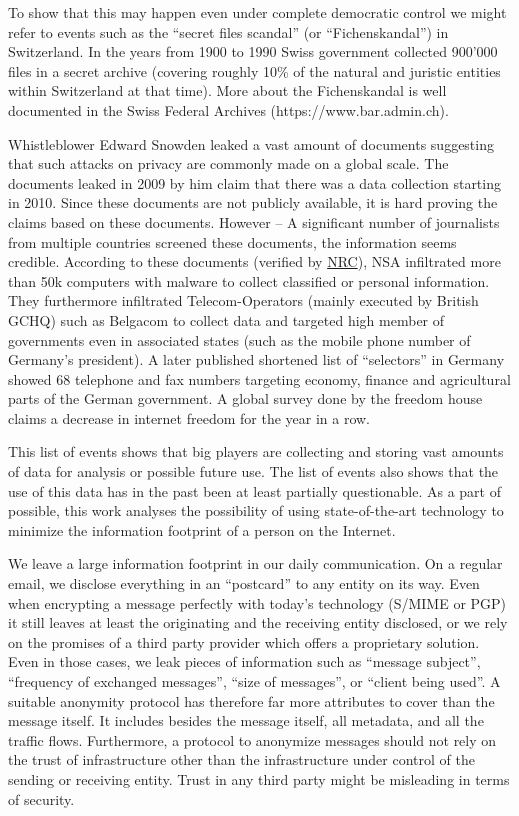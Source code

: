 To show that this may happen even under complete democratic control we might refer to events such as the ``secret files scandal'' (or  ``Fichenskandal'') in Switzerland. In the years from 1900 to 1990 Swiss government collected 900’000 files in a secret archive (covering roughly 10\% of the natural and juristic entities within Switzerland at that time). More about the Fichenskandal is well documented in the Swiss Federal Archives (https://www.bar.admin.ch).

Whistleblower Edward Snowden leaked a vast amount of documents suggesting that such attacks on privacy are commonly made on a global scale. The documents leaked in 2009 by him claim that there was a data collection starting in 2010. Since these documents are not publicly available, it is hard proving the claims based on these documents. However -- A significant number of journalists from multiple countries screened these documents, the information seems credible. According to these documents (verified by \href{http://www.nrc.nl/nieuws/2013/11/23/nederland-sinds-1946-doelwit-van-nsa}{NRC}), NSA infiltrated more than 50k computers with malware to collect classified or personal information. They furthermore infiltrated Telecom-Operators (mainly executed by British GCHQ) such as Belgacom to collect data and targeted high member of governments even in associated states (such as the mobile phone number of Germany's president). A later published shortened list of ``selectors'' in Germany showed 68 telephone and fax numbers targeting economy, finance and agricultural parts of the German government. A global survey done by the freedom house\cite{FOTN2018} claims a decrease in internet freedom for the  year in a row. 

This list of events shows that big players are collecting and storing vast amounts of data for analysis or possible future use. The list of events also shows that the use of this data has in the past been at least partially questionable. As a part of possible, this work analyses the possibility of using state-of-the-art technology to minimize the information footprint of a person on the Internet. 

We leave a large information footprint in our daily communication. On a regular email, we disclose everything in an ``postcard'' to any entity on its way. Even when encrypting a message perfectly with today's technology (S/MIME\cite{RFC2045} or PGP\cite{RFC2015}) it still leaves at least the originating and the receiving entity disclosed, or we rely on the promises of a third party provider which offers a proprietary solution. Even in those cases, we leak pieces of information such as ``message subject'', ``frequency of exchanged messages'', ``size of messages'', or ``client being used''. A suitable anonymity protocol has therefore far more attributes to cover than the message itself. It includes besides the message itself, all metadata, and all the traffic flows. Furthermore, a protocol to anonymize messages should not rely on the trust of infrastructure other than the infrastructure under control of the sending or receiving entity. Trust in any third party might be misleading in terms of security.

